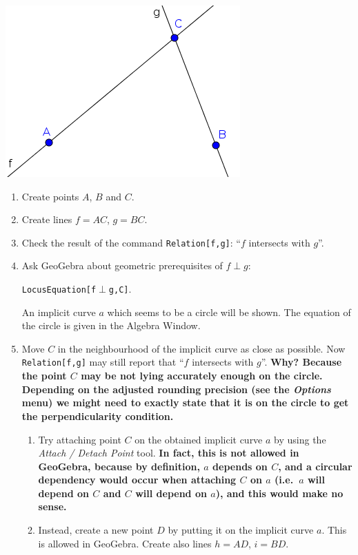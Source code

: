 \documentclass{article}
\begin{document}
\begin{center}
\includegraphics[scale=0.5]{limitations-Thales1-1}
\end{center}
\begin{enumerate}
    \item Create points $A$, $B$ and $C$.
    \item Create lines $f=AC$, $g=BC$.
    \item Check the result of the command \texttt{Relation[f,g]}: ``$f$ intersects with $g$''.
    \item Ask GeoGebra about geometric prerequisites of $f\perp g$:
\begin{center}\texttt{LocusEquation[f$\perp$g,C]}.\end{center}
An implicit curve $a$ which seems to be a circle will be shown. The equation of the circle
is given in the Algebra Window.
    \item Move $C$ in the neighbourhood of the implicit curve as close as possible. Now \texttt{Relation[f,g]} may still report that ``$f$ intersects with $g$''. \textbf{Why? Because the point $C$ may be not lying accurately enough on the circle. Depending on the adjusted rounding precision (see the \textit{Options} menu) we might need to exactly state that it is on the circle to get the perpendicularity condition.}
    \begin{enumerate}
      \item Try attaching point $C$ on the obtained implicit curve $a$ by using the \textit{Attach / Detach Point} tool. \textbf{In fact, this is not allowed in GeoGebra, because by definition, $a$ depends on $C$, and a circular dependency  would occur when attaching $C$ on $a$ (i.e.~$a$ will depend on $C$ and $C$ will depend on $a$), and this would make no sense.}
      \item Instead, create a new point $D$ by putting it on the implicit curve $a$. This is allowed in GeoGebra. Create also lines $h=AD$, $i=BD$.

\end{enumerate}
\end{enumerate}
\end{document}
